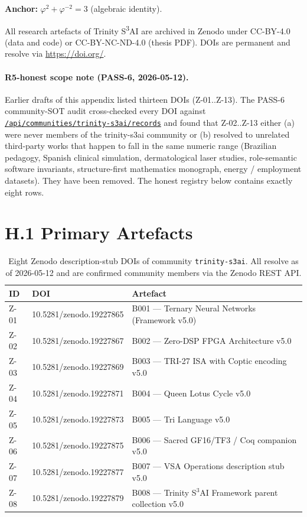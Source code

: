 \textbf{Anchor:} \(\varphi^2 + \varphi^{-2} = 3\) (algebraic identity).

\noindent All research artefacts of Trinity S\textsuperscript{3}AI are
archived in Zenodo under CC-BY-4.0 (data and code) or CC-BY-NC-ND-4.0 (thesis
PDF). DOIs are permanent and resolve via \url{https://doi.org/}.

\paragraph{R5-honest scope note (PASS-6, 2026-05-12).}
Earlier drafts of this appendix listed thirteen DOIs (Z-01..Z-13). The
PASS-6 community-SOT audit cross-checked every DOI against
\href{https://zenodo.org/api/communities/trinity-s3ai/records}{\texttt{/api/communities/trinity-s3ai/records}}
and found that Z-02..Z-13 either (a) were never members of the
trinity-s3ai community or (b) resolved to unrelated third-party works
that happen to fall in the same numeric range (Brazilian pedagogy,
Spanish clinical simulation, dermatological laser studies, role-semantic
software invariants, structure-first mathematics monograph, energy /
employment datasets). They have been removed. The honest registry below
contains exactly eight rows.

\section*{H.1 Primary Artefacts}

\begin{table}[h]
\centering
\begin{tabular}{lll}
\toprule
\textbf{ID} & \textbf{DOI} & \textbf{Artefact} \\
\midrule
Z-01 & 10.5281/zenodo.19227865 & B001 --- Ternary Neural Networks (Framework v5.0) \\
Z-02 & 10.5281/zenodo.19227867 & B002 --- Zero-DSP FPGA Architecture v5.0 \\
Z-03 & 10.5281/zenodo.19227869 & B003 --- TRI-27 ISA with Coptic encoding v5.0 \\
Z-04 & 10.5281/zenodo.19227871 & B004 --- Queen Lotus Cycle v5.0 \\
Z-05 & 10.5281/zenodo.19227873 & B005 --- Tri Language v5.0 \\
Z-06 & 10.5281/zenodo.19227875 & B006 --- Sacred GF16/TF3 / Coq companion v5.0 \\
Z-07 & 10.5281/zenodo.19227877 & B007 --- VSA Operations description stub v5.0 \\
Z-08 & 10.5281/zenodo.19227879 & B008 --- Trinity S$^3$AI Framework parent collection v5.0 \\
\bottomrule
\end{tabular}
\caption{Eight Zenodo description-stub DOIs of community \texttt{trinity-s3ai}.
All resolve as of 2026-05-12 and are confirmed community members via the
Zenodo REST API.}
\end{table}

